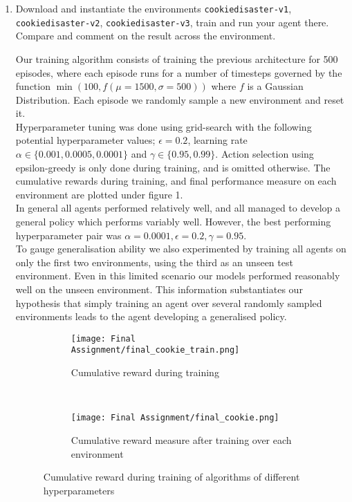 \documentclass{article}
\begin{document}
\begin{enumerate}
\item{Download and instantiate the environments \texttt{cookiedisaster-v1}, \texttt{cookiedisaster-v2}, \texttt{cookiedisaster-v3}, train and run your agent there. Compare and comment on the result across the environment.}

Our training algorithm consists of training the previous architecture for 500 episodes, where each episode runs for a number of timesteps governed by the function $\min(100, f(\mu=1500, \sigma=500))$ where $f$ is a Gaussian Distribution. Each episode we randomly sample a new environment and reset it. 
\\[2pt]
Hyperparameter tuning was done using grid-search with the following potential hyperparameter values; $\epsilon=0.2$, learning rate $\alpha \in \{0.001, 0.0005, 0.0001\}$ and $\gamma \in \{0.95, 0.99\}$. Action selection using epsilon-greedy is only done during training, and is omitted otherwise. The cumulative rewards during training, and final performance measure on each environment are plotted under figure 1.
\\[2pt]
In general all agents performed relatively well, and all managed to develop a general policy which performs variably well. However, the best performing hyperparameter pair was {$\alpha=0.0001, \epsilon=0.2, \gamma=0.95$}. 
\\[2pt]
To gauge generalisation ability we also experimented by training all agents on only the first two environments, using the third as an unseen test environment. Even in this limited scenario our models performed reasonably well on the unseen environment. This information substantiates our hypothesis that simply training an agent over several randomly sampled environments leads to the agent developing a generalised policy.

\begin{figure*}[b!]
    \centering
    \begin{subfigure}[t]{0.3\textwidth}
        \centering
        \texttt{[image: Final Assignment/final\_cookie\_train.png]}
        \caption{Cumulative reward during training}
    \end{subfigure}%
    ~ 
    \begin{subfigure}[t]{0.6\textwidth}
        \centering
        \texttt{[image: Final Assignment/final\_cookie.png]}
        \caption{Cumulative reward measure after training over each environment}
    \end{subfigure}
    \caption{Cumulative reward during training of algorithms of different hyperparameters}
\end{figure*}

\end{enumerate}
\end{document}

